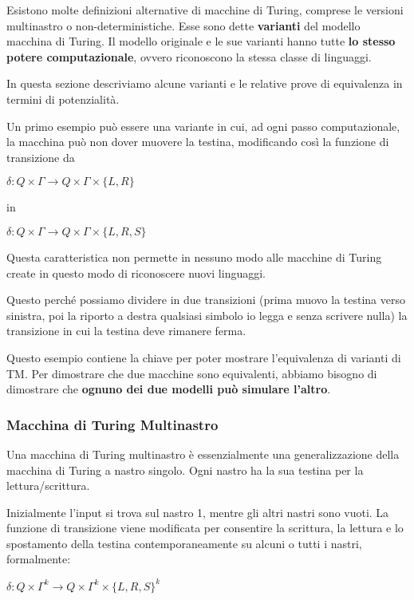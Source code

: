 \documentclass{article}
\begin{document}
Esistono molte definizioni alternative di macchine di Turing, comprese le versioni multinastro o non-deterministiche. Esse sono dette \textbf{varianti} del modello macchina di Turing. Il modello originale e le sue varianti hanno tutte \textbf{lo stesso potere computazionale}, ovvero riconoscono la stessa classe di linguaggi.

In questa sezione descriviamo alcune varianti e le relative prove di equivalenza in termini di potenzialità.

\noindent Un primo esempio può essere una variante in cui, ad ogni passo computazionale, la macchina può non dover muovere la testina, modificando così la funzione di transizione da

\begin{center}
    $\delta: Q \times \Gamma \rightarrow Q \times \Gamma \times \{L, R\}$

    in

    $\delta: Q \times \Gamma \rightarrow Q \times \Gamma \times \{L, R, S\}$
\end{center}

Questa caratteristica non permette in nessuno modo alle macchine di Turing create in questo modo di riconoscere nuovi linguaggi.

Questo perché possiamo dividere in due transizioni (prima muovo la testina verso sinistra, poi la riporto a destra qualsiasi simbolo io legga e senza scrivere nulla) la transizione in cui la testina deve rimanere ferma.

Questo esempio contiene la chiave per poter mostrare l'equivalenza di varianti di TM. Per dimostrare che due macchine sono equivalenti, abbiamo bisogno di dimostrare che \textbf{ognuno dei due modelli può simulare l'altro}.

\subsubsection{Macchina di Turing Multinastro}

Una macchina di Turing multinastro è essenzialmente una generalizzazione della macchina di Turing a nastro singolo. Ogni nastro ha la sua testina per la lettura/scrittura.

Inizialmente l'input si trova sul nastro 1, mentre gli altri nastri sono vuoti. La funzione di transizione viene modificata per consentire la scrittura, la lettura e lo spostamento della testina contemporaneamente su alcuni o tutti i nastri, formalmente:

\begin{center}
    $\delta: Q \times \Gamma^k \rightarrow Q \times \Gamma^k \times \{L, R, S\}^k$
\end{center}
\end{document}
